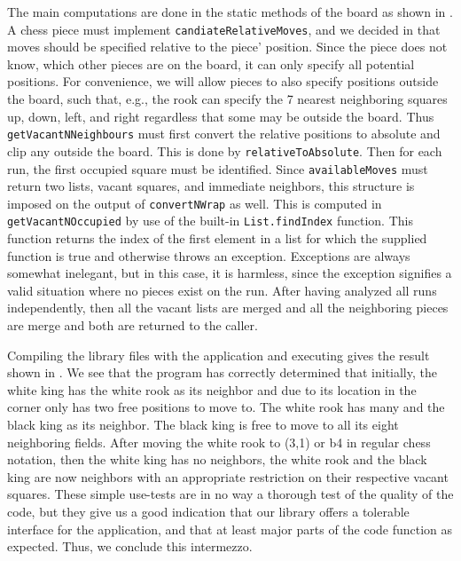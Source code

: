 The main computations are done in the static methods of the board as shown in . 
%
%
A chess piece must implement \lstinline{candiateRelativeMoves}, and we decided in  that moves should be specified relative to the piece' position. Since the piece does not know, which other pieces are on the board, it can only specify all potential positions. For convenience, we will allow pieces to also specify positions outside the board, such that, e.g., the rook can specify the 7 nearest neighboring squares up, down, left, and right regardless that some may be outside the board. Thus \lstinline{getVacantNNeighbours} must first convert the relative positions to absolute and clip any outside the board. This is done by \lstinline{relativeToAbsolute}. Then for each run, the first occupied square must be identified. Since \lstinline{availableMoves} must return two lists, vacant squares, and immediate neighbors, this structure is imposed on the output of \lstinline{convertNWrap} as well. This is computed in \lstinline{getVacantNOccupied} by use of the built-in \lstinline{List.findIndex} function. This function returns the index of the first element in a list for which the supplied function is true and otherwise throws an exception. Exceptions are always somewhat inelegant, but in this case, it is harmless, since the exception signifies a valid situation where no pieces exist on the run. After having analyzed all runs independently, then all the vacant lists are merged and all the neighboring pieces are merge and both are returned to the caller.

Compiling the library files with the application and executing gives the result shown in .
%
%
We see that the program has correctly determined that initially, the white king has the white rook as its neighbor and due to its location in the corner only has two free positions to move to. The white rook has many and the black king as its neighbor. The black king is free to move to all its eight neighboring fields. After moving the white rook to (3,1) or b4 in regular chess notation, then the white king has no neighbors, the white rook and the black king are now neighbors with an appropriate restriction on their respective vacant squares. These simple use-tests are in no way a thorough test of the quality of the code, but they give us a good indication that our library offers a tolerable interface for the application, and that at least major parts of the code function as expected. Thus, we conclude this intermezzo.


